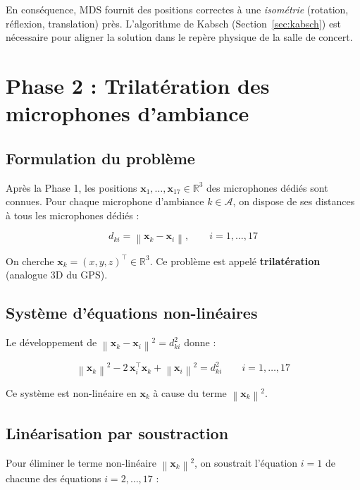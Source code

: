 \documentclass[12pt, a4paper]{article}
\theoremstyle{plain}
\theoremstyle{definition}
\newcommand{\R}{\mathbb{R}}
\newcommand{\norm}[1]{\left\lVert #1 \right\rVert}
\newcommand{\vect}[1]{\mathbf{#1}}
\begin{document}
En conséquence, MDS fournit des positions correctes à une \emph{isométrie}
(rotation, réflexion, translation) près. L'algorithme de Kabsch
(Section~\ref{sec:kabsch}) est nécessaire pour aligner la solution dans le
repère physique de la salle de concert.


\section{Phase 2 : Trilatération des microphones d'ambiance}

\subsection{Formulation du problème}

Après la Phase 1, les positions $\vect{x}_1, \ldots, \vect{x}_{17} \in \R^3$
des microphones dédiés sont connues. Pour chaque microphone d'ambiance $k \in
\mathcal{A}$, on dispose de ses distances à tous les microphones dédiés :

\[
    d_{ki} = \norm{\vect{x}_k - \vect{x}_i}, \qquad i = 1,\ldots,17
\]

On cherche $\vect{x}_k = (x, y, z)^\top \in \R^3$. Ce problème est appelé
\textbf{trilatération} (analogue 3D du GPS).

\subsection{Système d'équations non-linéaires}

Le développement de $\norm{\vect{x}_k - \vect{x}_i}^2 = d_{ki}^2$ donne :

\begin{equation}
    \norm{\vect{x}_k}^2 - 2\,\vect{x}_i^\top\vect{x}_k + \norm{\vect{x}_i}^2
    = d_{ki}^2
    \qquad i = 1,\ldots,17
    \label{eq:trilateration_nonlinear}
\end{equation}

Ce système est non-linéaire en $\vect{x}_k$ à cause du terme
$\norm{\vect{x}_k}^2$.

\subsection{Linéarisation par soustraction}

Pour éliminer le terme non-linéaire $\norm{\vect{x}_k}^2$, on soustrait
l'équation $i=1$ de chacune des équations $i = 2, \ldots, 17$ :
\end{document}
